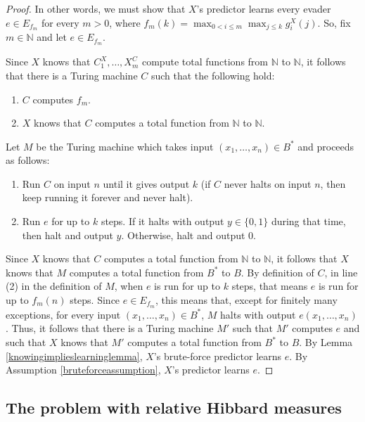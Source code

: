 \documentclass{article}
\begin{document}
\begin{proof}
    In other words, we must show that $X$'s predictor learns every
    evader $e\in E_{f_m}$ for every $m>0$, where
    $f_m(k)=\max_{0<i\leq m}\max_{j\leq k}g^X_i(j)$.
    So, fix $m\in\mathbb N$ and let $e\in E_{f_m}$.

    Since $X$ knows that $C^X_1,\ldots,X^C_m$ compute total functions from $\mathbb N$
    to $\mathbb N$, it follows that there is a Turing machine $C$ such that the following
    hold:
    \begin{enumerate}
        \item
        $C$ computes $f_m$.
        \item
        $X$ knows that $C$ computes a total function from $\mathbb N$ to $\mathbb N$.
    \end{enumerate}
    Let $M$ be the Turing machine which takes input $(x_1,\ldots,x_n)\in B^*$
    and proceeds as follows:
    \begin{enumerate}
        \item
        Run $C$ on input $n$ until it gives output $k$ (if $C$ never halts on input
        $n$, then keep running it forever and never halt).
        \item
        Run $e$ for up to $k$ steps. If it halts with output $y\in\{0,1\}$ during that
        time, then halt and output $y$. Otherwise, halt and output $0$.
    \end{enumerate}
    Since $X$ knows that $C$ computes a total function from $\mathbb N$ to $\mathbb N$,
    it follows that $X$ knows that $M$ computes a total function from $B^*$ to $B$.
    By definition of $C$, in line (2) in the definition of $M$, when $e$ is run for
    up to $k$ steps, that means $e$ is run for up to $f_m(n)$ steps.
    Since $e\in E_{f_m}$, this means that, except for finitely many exceptions,
    for every input $(x_1,\ldots,x_n)\in B^*$, $M$ halts with output
    $e(x_1,\ldots,x_n)$. Thus, it follows that there is a Turing machine $M'$
    such that $M'$ computes $e$ and such that $X$ knows that $M'$ computes a total
    function from $B^*$ to $B$. By Lemma \ref{knowingimplieslearninglemma},
    $X$'s brute-force predictor learns $e$. By Assumption \ref{bruteforceassumption},
    $X$'s predictor learns $e$.
\end{proof}

\subsection{The problem with relative Hibbard measures}
\label{problemwithsimplehibbardsection}
\end{document}
